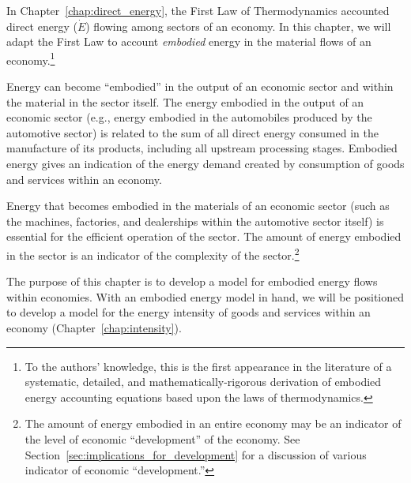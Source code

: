 


In Chapter~\ref{chap:direct_energy}, the 
First Law of Thermodynamics
accounted direct energy ($\dot{E}$) flowing among sectors of an economy.
In this chapter, we will adapt the First Law to account  
\emph{embodied} energy
in the material flows of 
an economy.\footnote{To the authors' knowledge, 
this is the first appearance in the literature 
of a systematic, detailed, and mathematically-rigorous derivation 
of embodied energy accounting equations based upon the 
laws of thermodynamics.}

Energy can become ``embodied'' in the output of an economic sector
and within the material in the sector itself.
The energy embodied in the output of an economic sector 
(e.g., energy embodied in the automobiles produced by the automotive sector)
is related to the sum of all direct energy
consumed in the manufacture of its products, 
including all upstream processing stages. 
Embodied energy gives an indication 
of the energy demand created by consumption of goods and services
within an economy.

Energy that becomes embodied in the materials of an economic sector 
(such as the machines, factories, and dealerships 
within the automotive sector itself) is essential for 
the efficient operation of the sector. The amount of energy
embodied in the sector is an indicator of the complexity of
the sector.\footnote{The amount of energy embodied in an entire economy
may be an indicator of the level of 
economic ``development''
of the economy. 
See Section~\ref{sec:implications_for_development} for a
discussion of various indicator of economic ``development.''}

The purpose of this chapter is to develop a model for 
embodied energy flows within economies. 
With an embodied energy model in hand, we will be positioned
to develop a model for the energy intensity 
of goods and services within an economy 
(Chapter~\ref{chap:intensity}).


